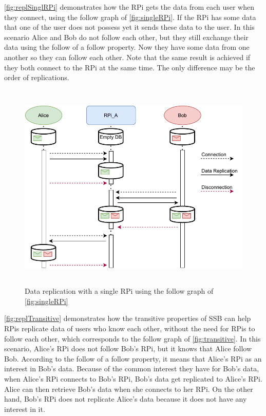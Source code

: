 \documentclass[a4paper,11pt,oneside]{report}
\begin{document}
\autoref{fig:replSinglRPi} demonstrates how the RPi gets the data from each user when they connect, using the follow graph of \autoref{fig:singleRPi}. If the RPi has some data that one of the user does not possess yet it sends these data to the user. In this scenario Alice and Bob do not follow each other, but they still exchange their data using the follow of a follow property. Now they have some data from one another so they can follow each other. Note that the same result is achieved if they both connect to the RPi at the same time. The only difference may be the order of replications.

\begin{figure}
  \includegraphics[height=10cm]{figures/replSingleRPi.pdf}
  \centering
  \caption{Data replication with a single RPi using the follow graph of \autoref{fig:singleRPi}}
  \label{fig:replSinglRPi}
\end{figure}


\autoref{fig:replTransitive} demonstrates how the transitive properties of SSB can help RPis replicate data of users who know each other, without the need for RPis to follow each other, which corresponds to the follow graph of \autoref{fig:transitive}. In this scenario, Alice's RPi does not follow Bob's RPi, but it knows that Alice follow Bob. According to the follow of a follow property, it means that Alice's RPi as an interest in Bob's data. Because of the common interest they have for Bob's data, when Alice's RPi connects to Bob's RPi, Bob's data get replicated to Alice's RPi. Alice can then retrieve Bob's data when she connects to her RPi. On the other hand, Bob's RPi does not replicate Alice's data because it does not have any interest in it.
\end{document}
